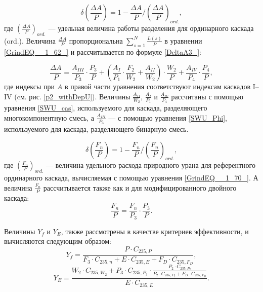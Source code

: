 \begin{equation} \label{DeltaA3} 
    \delta(\frac{\Delta A}{P})=1-\frac{\Delta A}{P}/(\frac{\Delta A}{P})_{ord.},
\end{equation}
где $(\frac{\Delta A}{P})_{ord.}$ --- удельная величина работы разделения для ординарного каскада (ord.). Величина $\frac{\Delta A}{P}$ пропорциональна $\sum _{s=1}^{N}\frac{L(s)}{P}$ в уравнении \ref{GrindEQ__1_62_} и рассчитывается по формуле \ref{DeltaA3_}:

\begin{equation} \label{DeltaA3_} 
\frac{\Delta A}{P} = \frac{A_{III}}{P_3} \cdot \frac{P_3}{P}+(\frac{A_I}{P_1} \cdot \frac{F_2}{W_2}+\frac{A_{II}}{W_2}) \cdot \frac{W_2}{P} + \frac{A_{IV}}{P_4} \cdot \frac{P_4}{P},
\end{equation}
где индексы при $A$ в правой части уравнения соответствуют индексам каскадов I--IV (cм. рис. \ref{p2_withDepU}). Величины $\frac{A_{II}}{W_2}$, $\frac{A_I}{P_1}$ и $\frac{A_{IV}}{P_4}$ рассчитаны с помощью уравнения \ref{SWU_cas}, используемого для каскада, разделяющего многокомпонентную смесь, а $\frac{A_{III}}{P_3}$ --- с помощью уравнения \ref{SWU_Phi}, используемого для каскада, разделяющего бинарную смесь.

\begin{equation} \label{DeltaFnu3} 
\delta(\frac{F_n}{P})=1-\frac{F_n}{P}/(\frac{F_n}{P})_{ord.},
\end{equation} 
где $(\frac{F_n}{P})_{ord.}$ --- величина удельного расхода природного урана для референтного ординарного каскада, вычисляемая с помощью уравнения \ref{GrindEQ__1_70_}. А величина $\frac{F_n}{P}$ рассчитывается также как и для модифицированного двойного каскада:
\begin{equation} \label{Delta_Fnu}
    \frac{F_n}{P} = \frac{F_n}{P_3} \cdot \frac{P_3}{P}.
\end{equation}

Величины $Y_f$ и $Y_{E}$, также рассмотрены в качестве критериев эффективности, и вычисляются следующим образом:
\begin{equation} \label{Rec3} 
    Y_{f} = \frac{P \cdot C_{235,P}}{F_3 \cdot C_{235,n} + E \cdot C_{235,E} + F_D \cdot C_{235,F_D}},
\end{equation} 
\begin{equation} \label{RecR3} 
    Y_{E} = \frac{W_2\cdot C_{235,W_2} + P_3 \cdot C_{235,P_3} \cdot \frac{P_2\cdot C_{235,P_2}}{P_2\cdot C_{235,P_2}+ F_D \cdot C_{235,F_D}}}{E \cdot C_{235,E}}   .     
\end{equation} 

